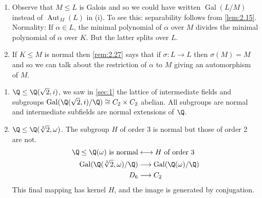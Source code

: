 \documentclass{article}
\DeclareMathOperator{\Aut}{Aut}
\DeclareMathOperator{\Gal}{Gal}
\begin{document}
\begin{remark}
    \begin{enumerate}[label=(\roman*)]
        \item Observe that $M \leq L$ is Galois and so we could have written $\Gal(L/M)$ instead of $\Aut_M(L)$ in (i).
            To see this: separability follows from \cref{lem:2.15}.
            Normality: If $\alpha \in L$, the minimal polynomial of $\alpha$ over $M$ divides the minimal polynomial of $\alpha$ over $K$.
            But the latter splits over $L$.
        \item If $K \leq M$ is normal then \cref{rem:2.27} says that if $\sigma: L \to L$ then $\sigma(M) = M$ and so we can talk about the restriction of $\alpha$ to $M$ giving an automorphism of $M$.
    \end{enumerate}
\end{remark}

\begin{eg}
    \begin{enumerate}[label=(\roman*)]
        \item $\Q \leq \Q(\sqrt{2}, i)$, we saw in \cref{sec:1} the lattice of intermediate fields and subgroups $\Gal(\Q(\sqrt{2}, i)/\Q) \cong C_2 \times C_2$ abelian.
            All subgroups are normal and intermediate subfields are normal extensions of $\Q$.
        \item $\Q \leq \Q(\sqrt[3]{2}, \omega)$.
            The subgroup $H$ of order 3 is normal but those of order 2 are not.
            \begin{align*}
                \Q \leq \Q(\omega) \text{ is normal} &\longleftrightarrow H \text{ of order } 3 \\
                \Gal(\Q(\sqrt[3]{2}, \omega)/\Q) &\longrightarrow \Gal(\Q(\omega)/\Q) \\
                D_6 &\longrightarrow C_2
            \end{align*}
            This final mapping has kernel $H$, and the image is generated by conjugation.
    \end{enumerate}
\end{eg}
\end{document}
